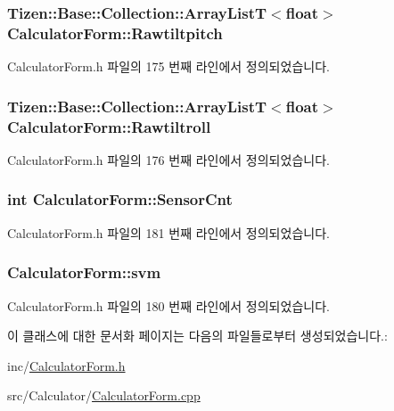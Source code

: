 \hypertarget{class_calculator_form_a7b784d40a3d83eee41bb8efae09142ca}{
\subsubsection[{Rawtiltpitch}]{\setlength{\rightskip}{0pt plus 5cm}Tizen\+::\+Base\+::\+Collection\+::\+Array\+List\+T$<$float$>$ Calculator\+Form\+::\+Rawtiltpitch\hspace{0.3cm}{\ttfamily [protected]}}}\label{class_calculator_form_a7b784d40a3d83eee41bb8efae09142ca}


Calculator\+Form.\+h 파일의 175 번째 라인에서 정의되었습니다.

\hypertarget{class_calculator_form_afc8797d0cb7657a384ccc03c7f335aed}{
\subsubsection[{Rawtiltroll}]{\setlength{\rightskip}{0pt plus 5cm}Tizen\+::\+Base\+::\+Collection\+::\+Array\+List\+T$<$float$>$ Calculator\+Form\+::\+Rawtiltroll\hspace{0.3cm}{\ttfamily [protected]}}}\label{class_calculator_form_afc8797d0cb7657a384ccc03c7f335aed}


Calculator\+Form.\+h 파일의 176 번째 라인에서 정의되었습니다.

\hypertarget{class_calculator_form_a846432327af7a8d40a4a3b586ee3581a}{
\subsubsection[{Sensor\+Cnt}]{\setlength{\rightskip}{0pt plus 5cm}int Calculator\+Form\+::\+Sensor\+Cnt\hspace{0.3cm}{\ttfamily [protected]}}}\label{class_calculator_form_a846432327af7a8d40a4a3b586ee3581a}


Calculator\+Form.\+h 파일의 181 번째 라인에서 정의되었습니다.

\hypertarget{class_calculator_form_ac3e3da16eada2566553b992a8d254366}{
\subsubsection[{svm}]{ Calculator\+Form\+::svm\hspace{0.3cm}{\ttfamily [protected]}}}\label{class_calculator_form_ac3e3da16eada2566553b992a8d254366}


Calculator\+Form.\+h 파일의 180 번째 라인에서 정의되었습니다.



이 클래스에 대한 문서화 페이지는 다음의 파일들로부터 생성되었습니다.\+:\begin{DoxyCompactItemize}
\item 
inc/\hyperlink{_calculator_form_8h}{Calculator\+Form.\+h}\item 
src/\+Calculator/\hyperlink{_calculator_form_8cpp}{Calculator\+Form.\+cpp}\end{DoxyCompactItemize}
